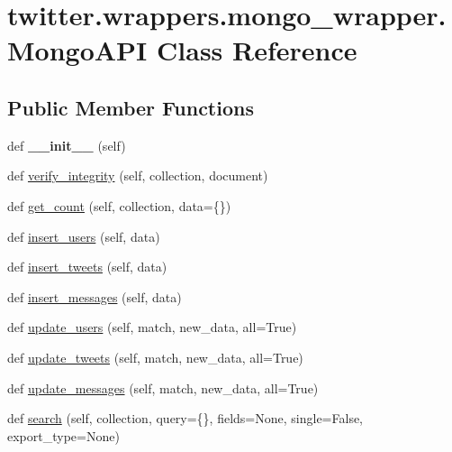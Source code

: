 \hypertarget{classtwitter_1_1wrappers_1_1mongo__wrapper_1_1MongoAPI}{}\section{twitter.\+wrappers.\+mongo\+\_\+wrapper.\+Mongo\+A\+PI Class Reference}
\label{classtwitter_1_1wrappers_1_1mongo__wrapper_1_1MongoAPI}
\subsection*{Public Member Functions}
\begin{DoxyCompactItemize}
\item 
\mbox{\label{classtwitter_1_1wrappers_1_1mongo__wrapper_1_1MongoAPI_afe7e92fefbe19be0561e810302fb4611}} 
def {\bfseries \+\_\+\+\_\+init\+\_\+\+\_\+} (self)
\item 
def \hyperlink{classtwitter_1_1wrappers_1_1mongo__wrapper_1_1MongoAPI_ad1adb6d5aa5e20cc43b77ab11d6403a3}{verify\+\_\+integrity} (self, collection, document)
\item 
def \hyperlink{classtwitter_1_1wrappers_1_1mongo__wrapper_1_1MongoAPI_a7c5d38f4ab2e2680224d47278b01d3bb}{get\+\_\+count} (self, collection, data=\{\})
\item 
def \hyperlink{classtwitter_1_1wrappers_1_1mongo__wrapper_1_1MongoAPI_a3f6edee30773ed114e48e32d54d45574}{insert\+\_\+users} (self, data)
\item 
def \hyperlink{classtwitter_1_1wrappers_1_1mongo__wrapper_1_1MongoAPI_a83f45c0a62f892db52f103756a523716}{insert\+\_\+tweets} (self, data)
\item 
def \hyperlink{classtwitter_1_1wrappers_1_1mongo__wrapper_1_1MongoAPI_af601222e36a6c0b6e131f788388ef992}{insert\+\_\+messages} (self, data)
\item 
def \hyperlink{classtwitter_1_1wrappers_1_1mongo__wrapper_1_1MongoAPI_aa4b9a6fb625844e6b78072b8818affd7}{update\+\_\+users} (self, match, new\+\_\+data, all=True)
\item 
def \hyperlink{classtwitter_1_1wrappers_1_1mongo__wrapper_1_1MongoAPI_a2b622e0eb9a3f45ecdf4b5f620f0231e}{update\+\_\+tweets} (self, match, new\+\_\+data, all=True)
\item 
def \hyperlink{classtwitter_1_1wrappers_1_1mongo__wrapper_1_1MongoAPI_a731dfdca8eac58b3b2b052e0a28bffcd}{update\+\_\+messages} (self, match, new\+\_\+data, all=True)
\item 
def \hyperlink{classtwitter_1_1wrappers_1_1mongo__wrapper_1_1MongoAPI_a6c5e6f8615e5795faffe3126b413dc05}{search} (self, collection, query=\{\}, fields=None, single=False, export\+\_\+type=None)
\end{DoxyCompactItemize}
